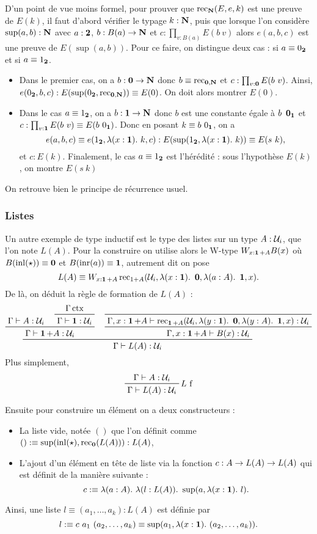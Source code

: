 \documentclass[../../rapport.tex]{subfiles}
\begin{document}
  D'un point de vue moins formel, pour prouver que $\operatorname{rec}_{\mathbf N}(E, e, k)$ est une preuve de $E(k)$,
  il faut d'abord vérifier le typage $k : \mathbf N$, puis que lorsque l'on considère $\sup(a, b) : \mathbf N$ avec
  $a : \operatorname{\textbf{2}}$, $b : B(a) \rightarrow \mathbf N$ et $c : \prod_{v : B(a)}{E(b\ v)}$ alors $e(a, b, c)$ est une preuve de $E(\sup(a, b))$.
  Pour ce faire, on distingue deux cas : si $a \equiv 0_{\operatorname{\textbf{2}}}$ et si $a \equiv 1_{\operatorname{\textbf{2}}}$.
  \begin{itemize}
    \item Dans le premier cas, on a $b : \operatorname{\textbf{0}} \rightarrow \mathbf N$ donc $b \equiv \operatorname{rec}_{\operatorname{\textbf{0}}, \mathbf N}$ et $c : \prod_{v:\0}{E(b\ v)}$.
      Ainsi, $e(0_{\operatorname{\textbf{2}}}, b, c) : E(\sup(0_{\operatorname{\textbf{2}}}, \operatorname{rec}_{\operatorname{\textbf{0}},\mathbf N})) \equiv E(0)$. On doit alors montrer $E(0)$.
    \item Dans le cas $a \equiv 1_{\operatorname{\textbf{2}}}$, on a $b : \operatorname{\textbf{1}} \rightarrow \mathbf N$ donc $b$ est une constante égale à $b\ \operatorname{\textbf{0}}_{\operatorname{\textbf{1}}}$ et
      $c : \prod_{v : \1}{E(b\ v)} \equiv E(b\ 0_{\1})$.
      Donc en posant $k \equiv b\ 0_{\1}$, on a
      $$e(a, b, c) \equiv e(1_{\operatorname{\textbf{2}}}, \lambda(x : \operatorname{\textbf{1}}).\ k, c) : E(\sup(1_{\operatorname{\textbf{2}}}, \lambda(x : \operatorname{\textbf{1}}).\ k)) \equiv E(s\ k),$$
      et $c : E(k)$.
      Finalement, le cas $a \equiv 1_{\operatorname{\textbf{2}}}$ est l'hérédité : sous l'hypothèse $E(k)$, on montre $E(s\ k)$
  \end{itemize}
  On retrouve bien le principe de récurrence usuel.

  \subsubsection{Listes}

  Un autre exemple de type inductif est le type des listes sur un type $A : \mathcal U_i$, que l'on note $L(A)$.
  Pour la construire on utilise alors le W-type $W_{x:\operatorname{\textbf{1}}+A}B(x)$ où $B(\operatorname{inl}(\star)) \equiv \operatorname{\textbf{0}}$ et $B(\operatorname{inr}(a)) \equiv \operatorname{\textbf{1}}$,
  autrement dit on pose
  $$L(A) \equiv W_{x:\operatorname{\textbf{1}} + A}\operatorname{rec}_{1+A}(\mathcal U_i, \lambda(x : \operatorname{\textbf{1}}).\ \operatorname{\textbf{0}}, \lambda(a : A).\ \operatorname{\textbf{1}}, x).$$
  De là, on déduit la règle de formation de $L(A)$ :
  $$
  \prfinterspace=1.2em
  \prftree
    {
      \prftree
	{\Gamma \vdash A : \U_i}
	{\prftree{\Gamma \ctx}{\Gamma \vdash \1 : \U_i}}
	  {\Gamma \vdash \1 + A : \U_i}
    }
    {
      \prftree
	{\prfaxiom{\Gamma, x : \1 + A \vdash \rec_{\1+A}(\U_i, \lambda(y : \1).\ \0, \lambda(y : A).\ \1, x) : \U_i}}
	{\Gamma, x : \1 + A \vdash B(x) : \U_i}
    }
      {\Gamma \vdash L(A) : \U_i}
  $$
  Plus simplement,
  $$
  \prftree[r]{$L$ f}{\Gamma \vdash A : \U_i}{\Gamma \vdash L(A) : \U_i}
  $$

  Ensuite pour construire un élément on a deux constructeurs :
  \begin{itemize}
    \item La liste vide, notée $()$ que l'on définit comme $() :\equiv \sup(\operatorname{inl}(\star), \operatorname{rec}_{\operatorname{\textbf{0}}}(L(A))) : L(A)$,
    \item L'ajout d'un élément en tête de liste via la fonction $c : A \rightarrow L(A) \rightarrow L(A)$ qui est définit de la manière suivante :
      $$c :\equiv \lambda(a : A).\ \lambda(l : L(A)).\ \sup(a, \lambda(x : \1).\ l).$$
  \end{itemize}
  Ainsi, une liste $l \equiv (a_1, \hdots, a_k) : L(A)$ est définie par
  $$l :\equiv c\ a_1\ (a_2, \hdots, a_k) \equiv \sup(a_1, \lambda(x : \operatorname{\textbf{1}}).\ (a_2, \hdots, a_k)).$$
\end{document}
